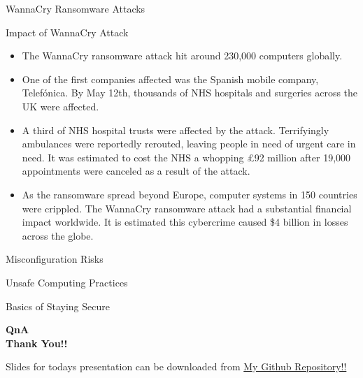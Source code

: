 \documentclass{beamer}
\begin{document}
\begin{frame}{WannaCry Ransomware Attacks}
	\begin{itemize}
\end{itemize}
\end{frame}
\begin{frame}{Impact of WannaCry Attack}
	\begin{itemize}
\item{The WannaCry ransomware attack hit around 230,000 computers globally.}
\item{One of the first companies affected was the Spanish mobile company, Telefónica. By May 12th, thousands of NHS hospitals and surgeries across the UK were affected.}
\item{A third of NHS hospital trusts were affected by the attack. Terrifyingly ambulances were reportedly rerouted, leaving people in need of urgent care in need. It was estimated to cost the NHS a whopping £92 million after 19,000 appointments were canceled as a result of the attack.}
 \item{As the ransomware spread beyond Europe, computer systems in 150 countries were crippled. The WannaCry ransomware attack had a substantial financial impact worldwide. It is estimated this cybercrime caused \$4 billion in losses across the globe.}
	\end{itemize}
\end{frame}

\begin{frame}{Misconfiguration Risks}
	
\end{frame}
\begin{frame}{Unsafe Computing Practices}
\end{frame}
\begin{frame}{Basics of Staying Secure}
\end{frame}
\begin{frame}
	\begin{center}
	\Large \textbf{QnA \\ Thank You!!}
	\end{center}
	\vspace*{3cm}
	\large Slides for todays presentation can be downloaded from \hyperlink{https://github.com/AnubhavMehraCS/Paper1Presentation/raw/master/ComputerHazard.pdf}{My Github Repository!!}
\end{frame}
\end{document}
